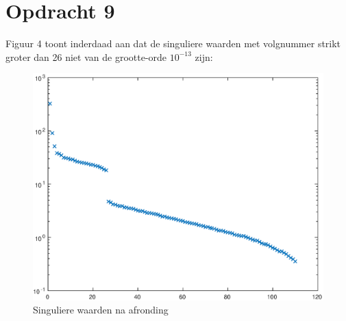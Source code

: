 \documentclass[11pt,a4paper]{article}
\begin{document}
\section*{Opdracht 9}
Figuur 4 toont inderdaad aan dat de singuliere waarden met volgnummer strikt groter dan 26 niet van de grootte-orde $10^{-13}$ zijn:
\begin{figure}[H]
\centering
\includegraphics[scale=0.55]{opdracht9a}
\caption{Singuliere waarden na afronding}
\end{figure}
\end{document}
